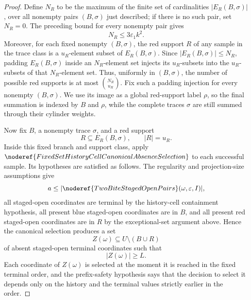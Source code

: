 \begin{proof}
Define \(N_R\) to be the maximum of the finite set of cardinalities
\(|E_R(B,\sigma)|\), over all nonempty pairs \((B,\sigma)\) just described;
if there is no such pair, set \(N_R=0\).  The preceding bound for every
nonempty pair gives
\[
N_R\le 3\varepsilon_1 k^2.
\]
Moreover, for each fixed nonempty \((B,\sigma)\), the red support \(R\) of
any sample in the trace class is a \(u_R\)-element subset of
\(E_R(B,\sigma)\).  Since \(|E_R(B,\sigma)|\le N_R\), padding
\(E_R(B,\sigma)\) inside an \(N_R\)-element set injects its \(u_R\)-subsets
into the \(u_R\)-subsets of that \(N_R\)-element set.  Thus, uniformly in
\((B,\sigma)\), the number of possible red supports is at most
\(\binom{N_R}{u_R}\).  Fix such a padding injection for every nonempty
\((B,\sigma)\).  We use its image as a global red-support label
\(\rho\), so the final summation is indexed by \(B\) and \(\rho\), while the
complete traces \(\sigma\) are still summed through their cylinder weights.

Now fix \(B\), a nonempty trace \(\sigma\), and a red support
\[
R\subseteq E_R(B,\sigma),\qquad |R|=u_R.
\]
Inside this fixed branch and support class, apply
\(\noderef{FixedSetHistoryCellCanonicalAbsenceSelection}\) to each successful
sample.  Its hypotheses are satisfied as follows.  The regularity and
projection-size assumptions give
\[
a\le |\noderef{TwoBiteStagedOpenPairs}(\omega,\varepsilon,I)|,
\]
all staged-open coordinates are terminal by the history-cell containment
hypothesis, all present blue staged-open coordinates are in \(B\), and all
present red staged-open coordinates are in \(R\) by the exceptional-set
argument above.  Hence the canonical selection produces a set
\[
Z(\omega)\subseteq U\setminus(B\cup R)
\]
of absent staged-open terminal coordinates such that
\[
|Z(\omega)|\ge L.
\]
Each coordinate of \(Z(\omega)\) is selected at the moment it is reached in
the fixed terminal order, and the prefix-safety hypothesis says that the
decision to select it depends only on the history and the terminal values
strictly earlier in the order.


\end{proof}
